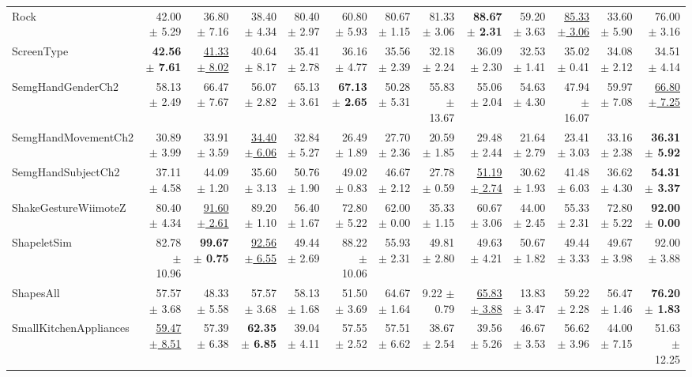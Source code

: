\begin{landscape}
\begin{longtable}{lrrrrrrrrrrrr}
Rock & 42.00 $\pm$ 5.29 & 36.80 $\pm$ 7.16 & 38.40 $\pm$ 4.34 & 80.40 $\pm$ 2.97 & 60.80 $\pm$ 5.93 & 80.67 $\pm$ 1.15 & 81.33 $\pm$ 3.06 & \textbf{88.67 $\pm$ 2.31} & 59.20 $\pm$ 3.63 & \underline{85.33 $\pm$ 3.06} & 33.60 $\pm$ 5.90 & 76.00 $\pm$ 3.16 \\
ScreenType & \textbf{42.56 $\pm$ 7.61} & \underline{41.33 $\pm$ 8.02} & 40.64 $\pm$ 8.17 & 35.41 $\pm$ 2.78 & 36.16 $\pm$ 4.77 & 35.56 $\pm$ 2.39 & 32.18 $\pm$ 2.24 & 36.09 $\pm$ 2.30 & 32.53 $\pm$ 1.41 & 35.02 $\pm$ 0.41 & 34.08 $\pm$ 2.12 & 34.51 $\pm$ 4.14 \\
SemgHandGenderCh2 & 58.13 $\pm$ 2.49 & 66.47 $\pm$ 7.67 & 56.07 $\pm$ 2.82 & 65.13 $\pm$ 3.61 & \textbf{67.13 $\pm$ 2.65} & 50.28 $\pm$ 5.31 & 55.83 $\pm$ 13.67 & 55.06 $\pm$ 2.04 & 54.63 $\pm$ 4.30 & 47.94 $\pm$ 16.07 & 59.97 $\pm$ 7.08 & \underline{66.80 $\pm$ 7.25} \\
SemgHandMovementCh2 & 30.89 $\pm$ 3.99 & 33.91 $\pm$ 3.59 & \underline{34.40 $\pm$ 6.06} & 32.84 $\pm$ 5.27 & 26.49 $\pm$ 1.89 & 27.70 $\pm$ 2.36 & 20.59 $\pm$ 1.85 & 29.48 $\pm$ 2.44 & 21.64 $\pm$ 2.79 & 23.41 $\pm$ 3.03 & 33.16 $\pm$ 2.38 & \textbf{36.31 $\pm$ 5.92} \\
SemgHandSubjectCh2 & 37.11 $\pm$ 4.58 & 44.09 $\pm$ 1.20 & 35.60 $\pm$ 3.13 & 50.76 $\pm$ 1.90 & 49.02 $\pm$ 0.83 & 46.67 $\pm$ 2.12 & 27.78 $\pm$ 0.59 & \underline{51.19 $\pm$ 2.74} & 30.62 $\pm$ 1.93 & 41.48 $\pm$ 6.03 & 36.62 $\pm$ 4.30 & \textbf{54.31 $\pm$ 3.37} \\
ShakeGestureWiimoteZ & 80.40 $\pm$ 4.34 & \underline{91.60 $\pm$ 2.61} & 89.20 $\pm$ 1.10 & 56.40 $\pm$ 1.67 & 72.80 $\pm$ 5.22 & 62.00 $\pm$ 0.00 & 35.33 $\pm$ 1.15 & 60.67 $\pm$ 3.06 & 44.00 $\pm$ 2.45 & 55.33 $\pm$ 2.31 & 72.80 $\pm$ 5.22 & \textbf{92.00 $\pm$ 0.00} \\
ShapeletSim & 82.78 $\pm$ 10.96 & \textbf{99.67 $\pm$ 0.75} & \underline{92.56 $\pm$ 6.55} & 49.44 $\pm$ 2.69 & 88.22 $\pm$ 10.06 & 55.93 $\pm$ 2.31 & 49.81 $\pm$ 2.80 & 49.63 $\pm$ 4.21 & 50.67 $\pm$ 1.82 & 49.44 $\pm$ 3.33 & 49.67 $\pm$ 3.98 & 92.00 $\pm$ 3.88 \\
ShapesAll & 57.57 $\pm$ 3.68 & 48.33 $\pm$ 5.58 & 57.57 $\pm$ 3.68 & 58.13 $\pm$ 1.68 & 51.50 $\pm$ 3.69 & 64.67 $\pm$ 1.64 & 9.22 $\pm$ 0.79 & \underline{65.83 $\pm$ 3.88} & 13.83 $\pm$ 3.47 & 59.22 $\pm$ 2.28 & 56.47 $\pm$ 1.46 & \textbf{76.20 $\pm$ 1.83} \\
SmallKitchenAppliances & \underline{59.47 $\pm$ 8.51} & 57.39 $\pm$ 6.38 & \textbf{62.35 $\pm$ 6.85} & 39.04 $\pm$ 4.11 & 57.55 $\pm$ 2.52 & 57.51 $\pm$ 6.62 & 38.67 $\pm$ 2.54 & 39.56 $\pm$ 5.26 & 46.67 $\pm$ 3.53 & 56.62 $\pm$ 3.96 & 44.00 $\pm$ 7.15 & 51.63 $\pm$ 12.25 \\

\end{longtable}
\end{landscape}
